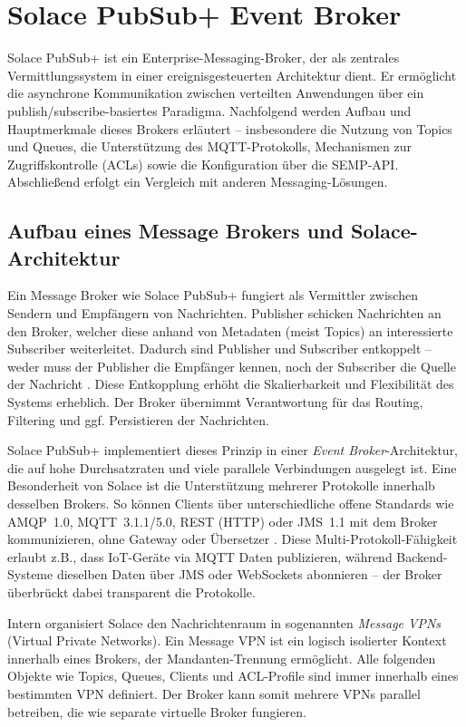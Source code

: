 
\section{Solace PubSub+ Event Broker}
Solace PubSub+ ist ein Enterprise-Messaging-Broker, der als zentrales Vermittlungssystem in einer ereignisgesteuerten Architektur dient. Er ermöglicht die asynchrone Kommunikation zwischen verteilten Anwendungen über ein publish/subscribe-basiertes Paradigma. Nachfolgend werden Aufbau und Hauptmerkmale dieses Brokers erläutert – insbesondere die Nutzung von Topics und Queues, die Unterstützung des MQTT-Protokolls, Mechanismen zur Zugriffskontrolle (ACLs) sowie die Konfiguration über die SEMP-API. Abschließend erfolgt ein Vergleich mit anderen Messaging-Lösungen.

\subsection{Aufbau eines Message Brokers und Solace-Architektur}

Ein Message Broker wie Solace PubSub+ fungiert als Vermittler zwischen Sendern und Empfängern von Nachrichten. Publisher schicken Nachrichten an den Broker, welcher diese anhand von Metadaten (meist Topics) an interessierte Subscriber weiterleitet. Dadurch sind Publisher und Subscriber entkoppelt – weder muss der Publisher die Empfänger kennen, noch der Subscriber die Quelle der Nachricht \cite{Eugster2003}. Diese Entkopplung erhöht die Skalierbarkeit und Flexibilität des Systems erheblich. Der Broker übernimmt Verantwortung für das Routing, Filtering und ggf. Persistieren der Nachrichten.

Solace PubSub+ implementiert dieses Prinzip in einer \textit{Event Broker}-Architektur, die auf hohe Durchsatzraten und viele parallele Verbindungen ausgelegt ist. Eine Besonderheit von Solace ist die Unterstützung mehrerer Protokolle innerhalb desselben Brokers. So können Clients über unterschiedliche offene Standards wie AMQP 1.0, MQTT 3.1.1/5.0, REST (HTTP) oder JMS 1.1 mit dem Broker kommunizieren, ohne Gateway oder Übersetzer \cite{SolaceProtocols}. Diese Multi-Protokoll-Fähigkeit erlaubt z.B., dass IoT-Geräte via MQTT Daten publizieren, während Backend-Systeme dieselben Daten über JMS oder WebSockets abonnieren – der Broker überbrückt dabei transparent die Protokolle.

Intern organisiert Solace den Nachrichtenraum in sogenannten \textit{Message VPNs} (Virtual Private Networks). Ein Message VPN ist ein logisch isolierter Kontext innerhalb eines Brokers, der Mandanten-Trennung ermöglicht. Alle folgenden Objekte wie Topics, Queues, Clients und ACL-Profile sind immer innerhalb eines bestimmten VPN definiert. Der Broker kann somit mehrere VPNs parallel betreiben, die wie separate virtuelle Broker fungieren.

